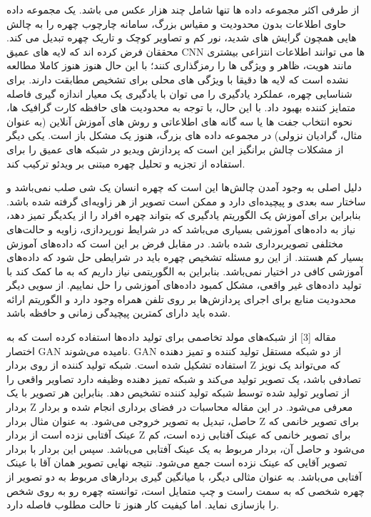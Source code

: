 از طرفی اکثر مجموعه داده ها تنها شامل چند هزار عکس می باشد. یک مجموعه داده حاوی اطلاعات بدون محدودیت و مقیاس بزرگ، سامانه چارچوب چهره را به چالش هایی همچون گرایش های شدید، نور کم و تصاویر کوچک و تاریک چهره تبدیل می کند. محققان فرض کرده اند که لایه های عمیق CNN ها می توانند اطلاعات انتزاعی بیشتری مانند هویت، ظاهر و ویژگی ها را رمزگذاری کنند؛ با این حال هنوز هنوز کاملا مطالعه نشده است که لایه ها دقیقا با ویژگی های محلی برای تشخیص مطابقت دارند.
برای شناسایی چهره، عملکرد یادگیری را می توان با یادگیری یک معیار اندازه گیری فاصله متمایز کننده بهبود داد. با این حال، با توجه به محدودیت های حافظه کارت گرافیک ها، نحوه انتخاب جفت ها یا سه گانه های اطلاعاتی و روش های آموزش آنلاین (به عنوان مثال، گرادیان نزولی) در مجموعه داده های بزرگ، هنوز یک مشکل باز است. یکی دیگر از مشکلات چالش برانگیز این است که پردازش ویدیو در شبکه های عمیق را برای استفاده از تجزیه و تحلیل چهره مبتنی بر ویدئو ترکیب کند.  



دلیل اصلی به وجود آمدن چالش‌ها این است که چهره انسان یک شی صلب نمی‌باشد و ساختار سه بعدی و پیچیده‌ای دارد و ممکن است تصویر از هر زاویه‌ای گرفته شده باشد. بنابراین برای آموزش یک الگوریتم یادگیری که بتواند چهره افراد را از یکدیگر تمیز دهد، نیاز به داده‌های آموزشی بسیاری می‌باشد که در شرایط نورپردازی، زاویه و حالت‌های مختلفی تصویربرداری شده باشد. در مقابل فرض بر این است که داده‌های آموزش بسیار کم هستند. از این رو مسئله تشخیص چهره باید در شرایطی حل شود که داده‌های آموزشی کافی در اختیار نمی‌باشد. بنابراین به الگوریتمی نیاز داریم که به ما کمک کند با تولید داده‌های غیر واقعی، مشکل کمبود داده‌های آموزشی را حل نماییم. از سویی دیگر محدودیت‌ منابع برای اجرای پردازش‌ها بر روی تلفن همراه وجود دارد و الگوریتم ارائه شده باید دارای کمترین پیچیدگی زمانی و حافظه باشد.


مقاله [3] از شبکه‌های مولد تخاصمی برای تولید داده‌ها استفاده کرده است که به اختصار GAN  نامیده می‌شوند. GAN از دو شبکه مستقل تولید کننده  و تمیز دهنده  استفاده تشکیل شده است. شبکه تولید کننده از روی بردار Z که می‌تواند یک نویز تصادفی باشد، یک تصویر تولید می‌کند و شبکه تمیز دهنده وظیفه دارد تصاویر واقعی را از تصاویر تولید شده توسط شبکه تولید کننده تشخیص دهد. بنابراین هر تصویر با یک بردار Z معرفی می‌شود. در این مقاله محاسبات در فضای برداری انجام شده و بردار حاصل، تبدیل به تصویر خروجی می‌شود. به عنوان مثال بردار Z برای تصویر خانمی که عینک آفتابی نزده است از بردار Z برای تصویر خانمی که عینک آفتابی زده است، کم می‌شود و حاصل آن، بردار مربوط به یک عینک آفتابی می‌باشد. سپس این بردار با بردار تصویر آقایی که عینک نزده است جمع می‌شود. نتیجه نهایی تصویر همان آقا با عینک آفتابی می‌باشد. به عنوان مثالی دیگر، با میانگین گیری بردارهای مربوط به دو تصویر از چهره شخصی که به سمت راست و چپ متمایل است، توانسته چهره رو به روی شخص را بازسازی نماید. اما کیفیت کار هنوز تا حالت مطلوب فاصله دارد.



